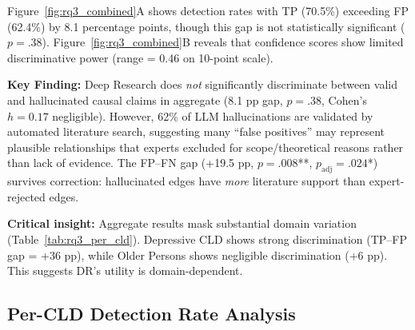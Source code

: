 \documentclass{article}
\begin{document}
Figure~\ref{fig:rq3_combined}A shows detection rates with TP (70.5\%) exceeding FP (62.4\%) by 8.1 percentage points, though this gap is not statistically significant ($p=.38$). Figure~\ref{fig:rq3_combined}B reveals that confidence scores show limited discriminative power (range = 0.46 on 10-point scale).

\textbf{Key Finding:} Deep Research does \textit{not} significantly discriminate between valid and hallucinated causal claims in aggregate (8.1 pp gap, $p=.38$, Cohen's $h=0.17$ negligible). However, 62\% of LLM hallucinations are validated by automated literature search, suggesting many ``false positives'' may represent plausible relationships that experts excluded for scope/theoretical reasons rather than lack of evidence. The FP--FN gap (+19.5 pp, $p=.008$**, $p_{\text{adj}}=.024$*) survives correction: hallucinated edges have \textit{more} literature support than expert-rejected edges.

\textbf{Critical insight:} Aggregate results mask substantial domain variation (Table~\ref{tab:rq3_per_cld}). Depressive CLD shows strong discrimination (TP--FP gap = +36 pp), while Older Persons shows negligible discrimination (+6 pp). This suggests DR's utility is domain-dependent.

\subsection{Per-CLD Detection Rate Analysis}
\end{document}
